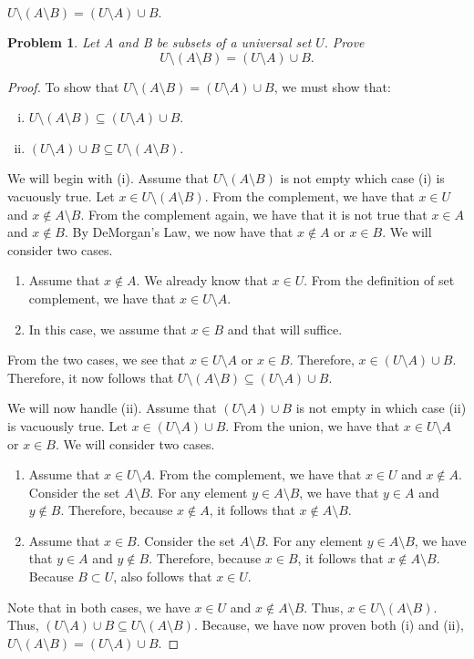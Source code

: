 \documentclass{article}
\newtheorem{problem}{Problem}
\begin{document}
$U\setminus(A \setminus B) = (U\setminus A)\cup B.$

\begin{problem}
 Let A and B be subsets of a universal set $U.$ Prove 
 $$ U\setminus(A \setminus B) = (U\setminus A)\cup B.$$  
\end{problem}
\begin{proof}
 To show that $U\setminus(A \setminus B) = (U\setminus A)\cup B$, we must show that:
\begin{enumerate}[(i)]
    \item $U\setminus(A \setminus B) \subseteq (U\setminus A)\cup B$.
    \item $(U\setminus A)\cup B \subseteq U\setminus(A \setminus B)$.
\end{enumerate}
We will begin with (i). Assume that $U\setminus(A \setminus B)$ is not empty which case (i) is vacuously true. Let $x \in U\setminus(A \setminus B)$. From the complement, we have that $x \in U$ and $x \not \in A \setminus B$. From the complement again, we have that it is not true that $x \in A$ and $x \not \in B$. By DeMorgan's Law, we now have that $x \not \in A$ or $x \in B$. We will consider two cases.
\begin{enumerate}
    \item Assume that $x \not \in A$. We already know that $x \in U$. From the definition of set complement, we have that $x \in U \setminus A$.
    \item In this case, we assume that $x \in B$ and that will suffice.
\end{enumerate}
From the two cases, we see that $x \in U \setminus A$ or $x \in B$. Therefore, $x \in (U \setminus A) \cup B$. Therefore, it now follows that $U\setminus(A \setminus B) \subseteq (U\setminus A)\cup B$.

We will now handle (ii). Assume that $(U \setminus A)\cup B$ is not empty in which case (ii) is vacuously true. Let $x \in (U\setminus A)\cup B$. From the union, we have that $x \in U \setminus A$ or $x \in B$. We will consider two cases.
\begin{enumerate}
    \item Assume that $x \in U \setminus A$. From the complement, we have that $x \in U$ and $x \not \in A$. Consider the set $A \setminus B$. For any element $y \in A \setminus B$, we have that $y \in A$ and $y \not \in B$. Therefore, because $x \not \in A$, it follows that $x \not \in A \setminus B$.
    \item Assume that $x \in B$. Consider the set $A \setminus B$. For any element $y \in A \setminus B$, we have that $y \in A$ and $y \not \in B$. Therefore, because $x \in B$, it follows that $x \not \in A \setminus B$. Because $B \subset U$, also follows that $x \in U$.
\end{enumerate}
Note that in both cases, we have $x \in U$ and $x \not \in A \setminus B$. Thus, $x \in U \setminus (A \setminus B)$. Thus, $(U\setminus A)\cup B \subseteq U\setminus(A \setminus B)$. Because, we have now proven both (i) and (ii), $U\setminus(A \setminus B) = (U\setminus A)\cup B$.
\end{proof}
\end{document}
